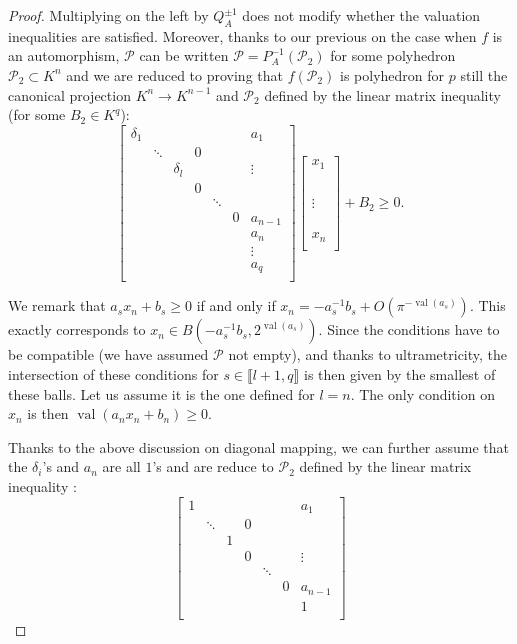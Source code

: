 \documentclass[a4paper,12pt]{article}
\newcommand{\PP}{\mathcal{P}}
\DeclareMathOperator{\val}{val}
\begin{document}
\begin{proof}
Multiplying on the left by $Q_A^{\pm 1}$ does not
modify whether the valuation inequalities are satisfied.
Moreover, thanks to our previous on the case when $f$ is an automorphism,
$\PP$ can be written
$\PP=P_A^{-1}(\PP_2)$ for some polyhedron $\PP_2 \subset K^n$
and we are reduced to proving that
$f(\PP_2)$ is polyhedron for $p$ still the canonical projection
$K^n \rightarrow K^{n-1}$ and $\PP_2$
defined by the linear matrix inequality (for some $B_2 \in K^q$):
\[  \begin{bmatrix}
\delta_1	& 		& 			&   &		 &  &a_1	\\
			& \ddots& 			& 0	&		 &	&		\\
			&		& \delta_l  &   & 		 &	& \vdots\\
			&		&			&0  & 		 &	& 		\\
			&		&			&   & \ddots &	&		\\
			&		&			&	&		 & 0&a_{n-1} \\
			&		&			&	&		 &	&a_n 	\\
			&		&			&	&		 &	& \vdots   	\\
			&		&			&	&		 &	&a_q 	\\			
\end{bmatrix} \begin{bmatrix} x_1 \\ \\ \\ \\ \\ \vdots \\ \\ \\ \\ x_n \\ \end{bmatrix} + B_2 \geq 0.\]



We remark that 
$a_s x_n + b_s \geq 0$
if and only if $x_n = -a_s^{-1} b_s + O(\pi^{- \val(a_s)}).$
This exactly corresponds to $x_n \in B(-a_s^{-1} b_s, 2^{\val(a_s)}).$
Since the conditions have to be compatible (we have assumed
$\PP$ not empty), and thanks to ultrametricity,  
the intersection of these conditions for 
$s \in \llbracket l+1,q \rrbracket$
is then given by the smallest of these balls.
Let us assume it is the one defined for $l=n.$
The only condition on $x_n$
is then $\val(a_nx_n +b_n) \geq 0.$

Thanks to the above discussion on diagonal mapping,
we can further assume that the $\delta_i$'s and $a_n$ are all $1$'s
and are reduce to $\PP_2$ defined by the linear matrix inequality :
\[  \begin{bmatrix}
1	& 		& 			&   &		 &  &a_1	\\
			& \ddots& 			& 0	&		 &	&		\\
			&		& 1  &   & 		 &	& \\
			&		&			&0  & 		 &	& 	\vdots	\\
			&		&			&   & \ddots &	&		\\
			&		&			&	&		 & 0&a_{n-1} \\
			&		&			&	&		 &	&1 	\\
		

\end{bmatrix}\]
\end{proof}
\end{document}

